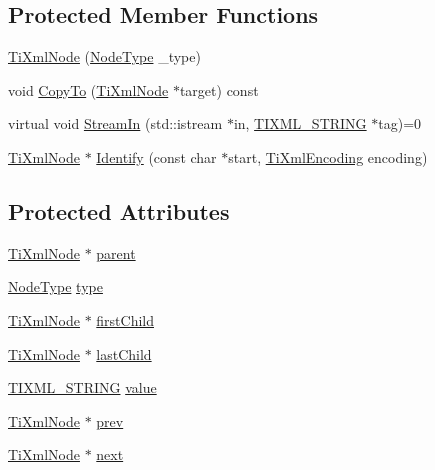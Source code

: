 \subsection*{Protected Member Functions}
\begin{DoxyCompactItemize}
\item 
\hyperlink{class_ti_xml_node_a3f46721695868667113c7487ff123f20}{Ti\+Xml\+Node} (\hyperlink{class_ti_xml_node_a836eded4920ab9e9ef28496f48cd95a2}{Node\+Type} \+\_\+type)
\item 
void \hyperlink{class_ti_xml_node_aaadd5bb9c94f84c4472b649b95de4a0b}{Copy\+To} (\hyperlink{class_ti_xml_node}{Ti\+Xml\+Node} $\ast$target) const
\item 
virtual void \hyperlink{class_ti_xml_node_ab4b4af1a6b486dcbc0e327cf291270af}{Stream\+In} (std\+::istream $\ast$in, \hyperlink{tinyxml_8h_a92bada05fd84d9a0c9a5bbe53de26887}{T\+I\+X\+M\+L\+\_\+\+S\+T\+R\+I\+NG} $\ast$tag)=0
\item 
\hyperlink{class_ti_xml_node}{Ti\+Xml\+Node} $\ast$ \hyperlink{class_ti_xml_node_ac1e3a8e7578be463b04617786120c2bb}{Identify} (const char $\ast$start, \hyperlink{tinyxml_8h_a88d51847a13ee0f4b4d320d03d2c4d96}{Ti\+Xml\+Encoding} encoding)
\end{DoxyCompactItemize}
\subsection*{Protected Attributes}
\begin{DoxyCompactItemize}
\item 
\hyperlink{class_ti_xml_node}{Ti\+Xml\+Node} $\ast$ \hyperlink{class_ti_xml_node_a662c4de61244e4fa5bd4e2d8c63143a5}{parent}
\item 
\hyperlink{class_ti_xml_node_a836eded4920ab9e9ef28496f48cd95a2}{Node\+Type} \hyperlink{class_ti_xml_node_a2619c6379181c16ba95ae6922e2ca839}{type}
\item 
\hyperlink{class_ti_xml_node}{Ti\+Xml\+Node} $\ast$ \hyperlink{class_ti_xml_node_af749fb7f22010b80e8f904c32653d50e}{first\+Child}
\item 
\hyperlink{class_ti_xml_node}{Ti\+Xml\+Node} $\ast$ \hyperlink{class_ti_xml_node_a5b30756d21b304580d22a841ec9d61f8}{last\+Child}
\item 
\hyperlink{tinyxml_8h_a92bada05fd84d9a0c9a5bbe53de26887}{T\+I\+X\+M\+L\+\_\+\+S\+T\+R\+I\+NG} \hyperlink{class_ti_xml_node_aead528b3cedc33c16a6c539872c7cc8b}{value}
\item 
\hyperlink{class_ti_xml_node}{Ti\+Xml\+Node} $\ast$ \hyperlink{class_ti_xml_node_a9c5370ea2cbfd9f0e0f7b30a57fd68f5}{prev}
\item 
\hyperlink{class_ti_xml_node}{Ti\+Xml\+Node} $\ast$ \hyperlink{class_ti_xml_node_a2f329cc993d2d34df76e17dcbb776b45}{next}
\end{DoxyCompactItemize}
